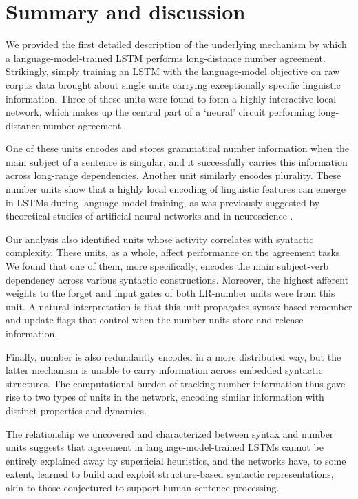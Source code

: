\section{Summary and discussion}
We provided the first  detailed description of the underlying mechanism by which a language-model-trained LSTM performs long-distance  number agreement. %
Strikingly, simply training an LSTM with the language-model objective on raw corpus data brought about single units carrying exceptionally specific linguistic information. Three of these units were found to form a highly interactive local network, which makes up the central part of a `neural' circuit performing long-distance number agreement.

One of these units encodes and stores grammatical number information
when the main subject of a sentence is singular, and it successfully
carries this information across long-range dependencies. Another unit
similarly encodes plurality. These number units show that a highly
local encoding of linguistic features can emerge in LSTMs during
language-model training, as was previously suggested by theoretical
studies of artificial neural networks \cite[e.g.][]{Bowers:2009} and in
neuroscience \cite[e.g.,][]{Kutter:etal:2018}.

Our analysis also identified units whose activity correlates with syntactic complexity. These units, as a whole, affect performance on the agreement tasks. We found that one of them, more specifically, encodes the main subject-verb dependency across various syntactic constructions. Moreover, the highest afferent weights to the forget and input gates of both LR-number units were from this unit. A natural interpretation is that this unit propagates syntax-based remember and update flags that control when the number units store and release information.

Finally, number is also redundantly encoded in a more distributed way, but the latter mechanism is unable to carry information across embedded syntactic structures. The computational burden of tracking number information thus gave rise to two types of units in the network,  encoding similar information  with distinct properties and dynamics.

The relationship we uncovered and characterized between syntax and number units suggests that agreement in language-model-trained LSTMs cannot be entirely explained away by superficial heuristics, and the networks have, to some extent, learned to build and exploit structure-based syntactic representations, akin to those conjectured to support human-sentence processing.

